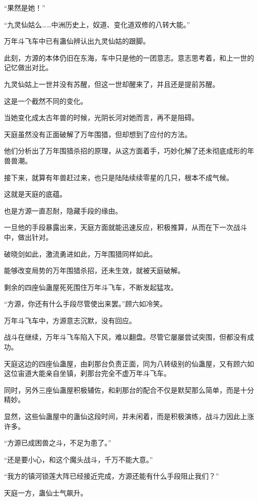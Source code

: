\begin{this_body}
“果然是她！”

“九灵仙姑么……中洲历史上，奴道、变化道双修的八转大能。”

万年斗飞车中已有蛊仙辨认出九灵仙姑的跟脚。

此刻，方源的本体仍旧在东海，车中只是他的一团意志。意志思考着，和上一世的记忆做出对比。

九灵仙姑上一世并没有苏醒，但这一世却醒来了，并且还是提前苏醒。

这是一个截然不同的变化。

当她变化成太古年兽的时候，光阴长河对她而言，再不是阻碍。

天庭虽然没有正面破解了万年围猎，但却想到了应付的方法。

他们分析出了万年围猎杀招的原理，从这方面着手，巧妙化解了还未彻底成形的年兽兽潮。

接下来，就算有年兽赶过来，也只是陆陆续续零星的几只，根本不成气候。

这就是天庭的底蕴。

也是方源一直忍耐，隐藏手段的缘由。

一旦他的手段暴露出来，天庭方面就能迅速反应，积极推算，从而在下一次战斗中，做出针对。

破晓剑如此，激流勇进如此，万年围猎同样如此。

能够改变局势的万年围猎杀招，还未生效，就被天庭破解。

剩余的四座仙蛊屋死死围住万年斗飞车，不断发起猛攻。

“方源，你还有什么手段尽管使出来罢。”顾六如冷笑。

万年斗飞车中，方源意志沉默，没有回应。

战斗在继续，万年斗飞车陷入下风，难以翻盘。尽管它屡屡尝试突围，但都没有成功。

天庭这边的四座仙蛊屋，由刹那台负责正面，同为八转级别的仙蛊屋，又有顾六如这位宙道大能亲自坐镇，刹那台完全不虚万年斗飞车。

同时，另外三座仙蛊屋积极辅佐，和刹那台的配合不仅是默契那么简单，而是十分精妙。

显然，这些仙蛊屋中的蛊仙这段时间，并未闲着，而是积极演练，战斗力因此上涨许多。

“方源已成困兽之斗，不足为患了。”

“还是要小心，和这个魔头战斗，千万不能大意。”

“我方的镇河锁莲大阵已经接近完成，方源还能有什么手段阻止我们？”

天庭一方，蛊仙士气飙升。


\end{this_body}
